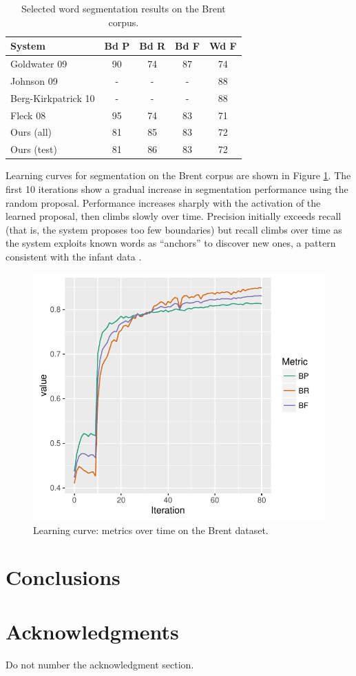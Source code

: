 \documentclass[11pt,letterpaper]{article}
\begin{document}

\begin{table}
\begin{tabular}{p{2.1cm}cccc}
System & Bd P & Bd R & Bd F & Wd F\\
\hline
Goldwater 09       & 90 & 74 & 87 & 74\\ 
Johnson 09         & - & - & - & 88\\
Berg-Kirkpatrick 10 & - & - & - & 88\\
Fleck 08           & 95 & 74 & 83 & 71\\
\hline
Ours (all) & 81 & 85 & 83 & 72\\
Ours (test) & 81 & 86 & 83 & 72\\
\end{tabular}
\caption{Selected word segmentation results on the Brent corpus.}
\label{tab-results}
\end{table}

Learning curves for segmentation on the Brent corpus are shown in
Figure \ref{fig-learning-curve}. The first 10 iterations show a
gradual increase in segmentation performance using the random
proposal. Performance increases sharply with the activation of
the learned proposal, then climbs slowly over time. Precision
initially exceeds recall (that is, the system proposes too few
boundaries) but recall climbs over time as the system exploits known
words as ``anchors'' to discover new ones, a pattern consistent with
the infant data \cite{Bortfeld05}.

\begin{figure}
\includegraphics[width=\columnwidth]{learning-curve.pdf}
\caption{Learning curve: metrics over time on the Brent dataset.}
\label{fig-learning-curve}
\end{figure}

\section{Conclusions}

\section*{Acknowledgments}

Do not number the acknowledgment section.



\end{document}
